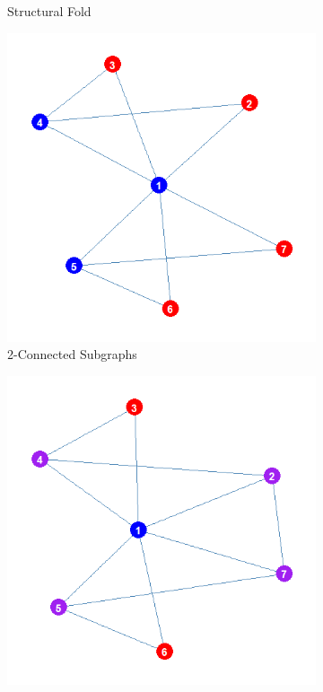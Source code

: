 \documentclass[12pt]{article}
\begin{document}
\begin{figure}
\begin{subfigure}[b]{0.45\textwidth}
            \caption{Structural Fold}
            \label{fig:sf}
    \end{subfigure}
    \begin{subfigure}[b]{0.45\textwidth}
        \includegraphics[width=1.0\textwidth]{Plots/intra.png}
            \caption{2-Connected Subgraphs}
            \label{fig:intra}
    \end{subfigure}
    \begin{subfigure}[b]{0.45\textwidth}
        \includegraphics[width=1.0\textwidth]{Plots/inter.png}

\end{subfigure}
\end{figure}
\end{document}
